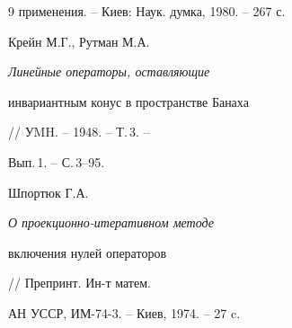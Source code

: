 \begin{thebibliography}{9}
{применения}. -- Киев: Наук. думка, 1980. -- 267 с. 




Крейн М.Г., Рутман М.А. {\em Линейные операторы, оставляющие 


инвариантным конус в пространстве Банаха} // УMH. -- 1948. -- Т.\,3. -- 


Вып.\,1. -- С.\,3--95. 




Шпортюк Г.А. {\em О проекционно-итеративном методе 


включения нулей операторов} // Препринт. Ин-т матем. 


АН УССР, ИМ-74-3. -- Киев, 1974. -- 27 c. 


 


\end{thebibliography} 


 


\vskip 2cm 


 






 


\label{end} 


 


